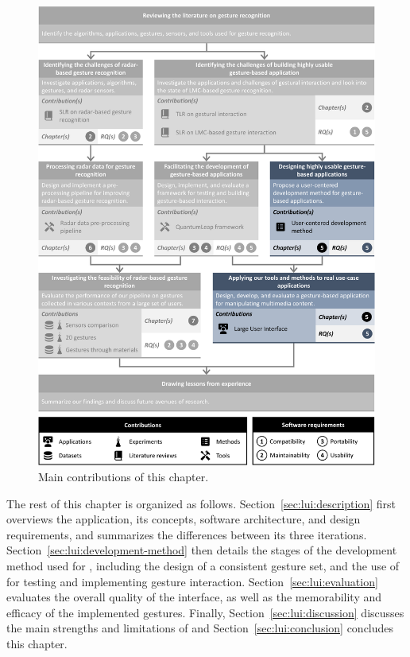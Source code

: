 \begin{figure}
    \centering
    \includegraphics[width=\linewidth]{Figures/LUI/graphical-summary-large-user-interface.pdf}
    \vspace{-18pt}
    \caption{Main contributions of this chapter.}
    \label{fig:lui:graphical-summary}
\end{figure}

The rest of this chapter is organized as follows.
Section~\ref{sec:lui:description} first overviews the \lui application, its concepts, software architecture, and design requirements, and summarizes the differences between its three iterations.
Section~\ref{sec:lui:development-method} then details the stages of the development method used for \lui, including the design of a consistent gesture set, and the use of \ql for testing and implementing gesture interaction.
Section~\ref{sec:lui:evaluation} evaluates the overall quality of the interface, as well as the memorability and efficacy of the implemented gestures.
Finally, Section~\ref{sec:lui:discussion}  discusses the main strengths and limitations of \lui and Section~\ref{sec:lui:conclusion} concludes this chapter.

